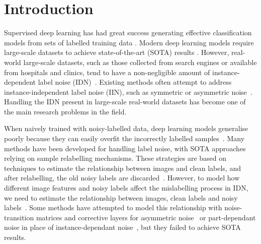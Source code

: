 \documentclass[10pt,twocolumn,letterpaper]{article}
\begin{document}
\section{Introduction}
\label{sec:introduction}



Supervised deep learning has had great success generating effective classification models from sets of labelled training data \cite{krizhevsky2012imagenet,lecun2015deep}. 
Modern deep learning models require large-scale datasets to achieve state-of-the-art (SOTA) results \cite{pham2020meta,radford2021learning}.
However, real-world large-scale datasets, such as those collected from search engines or available from hospitals and clinics, tend to have a non-negligible amount of instance-dependent label noise (IDN)~\cite{li2017webvision, wang2017chestx}. 
Existing methods often attempt to address instance-independent label noise (IIN), such as symmetric or asymmetric noise~\cite{zhang2021learning, Goldberger2017TrainingDN, xiao2015learning}. Handling the IDN present in large-scale real-world datasets has become one of the main research problems in the field.

When naively trained with noisy-labelled data, deep learning models generalise poorly because they can easily overfit the incorrectly labelled samples~\cite{zhang2016understanding}. 
Many methods have been developed for handling label noise, with SOTA approaches relying on sample relabelling mechanisms. 
These strategies are based on techniques to estimate the relationship between images and clean labels, and after relabelling, the old noisy labels are discarded~\cite{li2020dividemix, zhang2021learning, song2019selfie}.
However, to model how different image features and noisy labels affect the mislabelling process in IDN, we need to estimate the relationship between images, clean labels and noisy labels~\cite{zhang2021learning, gu2021instancedependent}.
Some methods have attempted to model this relationship with noise-transition matrices and corrective layers for asymmetric noise~\cite{xia2019anchor, Goldberger2017TrainingDN, patrini2017making} or part-dependant noise in place of instance-dependant noise~\cite{xia2020part}, but they failed to achieve SOTA results.
\end{document}

